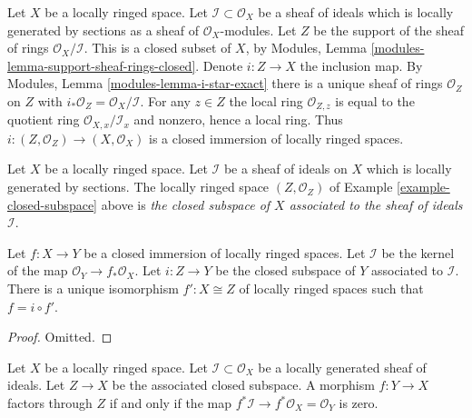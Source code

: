 \begin{example}
\label{example-closed-subspace}
Let $X$ be a locally ringed space.
Let $\mathcal{I} \subset \mathcal{O}_X$ be a sheaf
of ideals which is locally generated by sections as a sheaf
of $\mathcal{O}_X$-modules. Let $Z$ be the support of
the sheaf of rings $\mathcal{O}_X/\mathcal{I}$.
This is a closed subset of $X$, by 
Modules, Lemma \ref{modules-lemma-support-sheaf-rings-closed}.
Denote $i : Z \to X$ the inclusion map.
By Modules, Lemma \ref{modules-lemma-i-star-exact}
there is a unique sheaf of rings $\mathcal{O}_Z$ on $Z$
with $i_*\mathcal{O}_Z = \mathcal{O}_X/\mathcal{I}$.
For any $z \in Z$ the local ring $\mathcal{O}_{Z, z}$
is equal to the quotient ring $\mathcal{O}_{X, x}/\mathcal{I}_x$
and nonzero, hence a local ring.
Thus $i : (Z, \mathcal{O}_Z) \to (X, \mathcal{O}_X)$ is
a closed immersion of locally ringed spaces.
\end{example}

\begin{definition}
\label{definition-closed-subspace}
Let $X$ be a locally ringed space.
Let $\mathcal{I}$ be a sheaf of ideals on $X$
which is locally generated by sections.
The locally ringed space $(Z, \mathcal{O}_Z)$
of Example \ref{example-closed-subspace} above
is {\it the closed subspace of $X$ associated to
the sheaf of ideals $\mathcal{I}$}.
\end{definition}

\begin{lemma}
\label{lemma-closed-immersion}
Let $f : X \to Y$ be a closed immersion of 
locally ringed spaces. Let $\mathcal{I}$ be the
kernel of the map $\mathcal{O}_Y \to f_*\mathcal{O}_X$.
Let $i : Z \to Y$ be the closed subspace of $Y$
associated to $\mathcal{I}$.
There is a unique isomorphism $f' : X \cong Z$ of
locally ringed spaces such that $f = i \circ f'$.
\end{lemma}

\begin{proof}
Omitted.
\end{proof}

\begin{lemma}
\label{lemma-characterize-closed-subspace}
Let $X$ be a locally ringed space.
Let $\mathcal{I} \subset \mathcal{O}_X$ be a locally
generated sheaf of ideals.
Let $Z \to X$ be the associated closed subspace.
A morphism $f : Y \to X$ factors through $Z$ if
and only if the map
$f^*\mathcal{I} \to f^*\mathcal{O}_X = \mathcal{O}_Y$
is zero.
\end{lemma}

